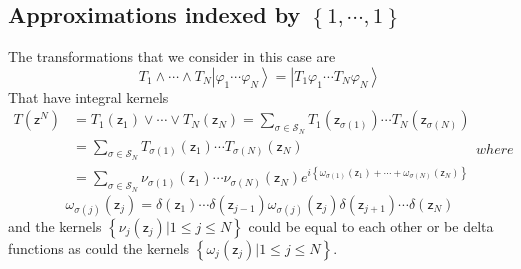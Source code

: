 \documentclass[aps,preprint]{revtex4}%
\begin{document}
\subsection{Approximations indexed by $\left\{  1,\cdots,1\right\}  $}

The transformations that we consider in this case are
\begin{equation}
T_{1}\wedge\cdots\wedge T_{N}\left\vert \varphi_{1}\cdots\varphi
_{N}\right\rangle =\left\vert T_{1}\varphi_{1}\cdots T_{N}\varphi
_{N}\right\rangle
\end{equation}
That have integral kernels
\begin{subequations}
\begin{align}
T\left(  \mathsf{z}^{N}\right)   &  =T_{1}\left(  \mathsf{z}_{1}\right)
\vee\cdots\vee T_{N}\left(  \mathsf{z}_{N}\right)  =%
{\textstyle\sum\limits_{\sigma\in\mathcal{S}_{N}}}
T_{1}\left(  \mathsf{z}_{\sigma\left(  1\right)  }\right)  \cdots T_{N}\left(
\mathsf{z}_{\sigma\left(  N\right)  }\right) \nonumber\\
&  =%
{\textstyle\sum\limits_{\sigma\in\mathcal{S}_{N}}}
T_{\sigma\left(  1\right)  }\left(  \mathsf{z}_{1}\right)  \cdots
T_{\sigma\left(  N\right)  }\left(  \mathsf{z}_{N}\right) \nonumber\\
&  =\sum_{\sigma\in\mathcal{S}_{N}}\nu_{\sigma\left(  1\right)  }\left(
\mathsf{z}_{1}\right)  \cdots\nu_{\sigma\left(  N\right)  }\left(
\mathsf{z}_{N}\right)  e^{i\left\{  \omega_{\sigma\left(  1\right)  }\left(
\mathsf{z}_{1}\right)  +\cdots+\omega_{\sigma\left(  N\right)  }\left(
\mathsf{z}_{N}\right)  \right\}  }%
\end{align}
where
\end{subequations}
\begin{equation}
\omega_{\sigma\left(  j\right)  }\left(  \mathsf{z}_{j}\right)  =\delta\left(
\mathsf{z}_{1}\right)  \cdots\delta\left(  \mathsf{z}_{j-1}\right)
\omega_{\sigma\left(  j\right)  }\left(  \mathsf{z}_{j}\right)  \delta\left(
\mathsf{z}_{j+1}\right)  \cdots\delta\left(  \mathsf{z}_{N}\right)
\end{equation}
and the kernels $\left\{  \nu_{j}\left(  \mathsf{z}_{j}\right)  |1\leq j\leq
N\right\}  $ could be equal to each other or be delta functions as could the
kernels $\left\{  \omega_{j}\left(  \mathsf{z}_{j}\right)  |1\leq j\leq
N\right\}  $.
\end{document}

